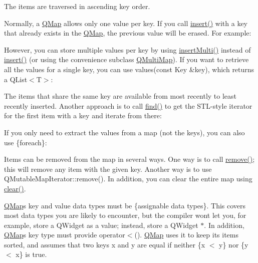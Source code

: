 \begin{DoxyCodeInclude}
\end{DoxyCodeInclude}
 The items are traversed in ascending key order.

Normally, a \hyperlink{class_q_map}{Q\+Map} allows only one value per key. If you call \hyperlink{class_q_map_a0cc56ab47ea14af1127ac7399814d289}{insert()} with a key that already exists in the \hyperlink{class_q_map}{Q\+Map}, the previous value will be erased. For example\+:


\begin{DoxyCodeInclude}
\end{DoxyCodeInclude}
 However, you can store multiple values per key by using \hyperlink{class_q_map_a075634da2cf912a20dd1c4a5835acfa3}{insert\+Multi()} instead of \hyperlink{class_q_map_a0cc56ab47ea14af1127ac7399814d289}{insert()} (or using the convenience subclass \hyperlink{class_q_multi_map}{Q\+Multi\+Map}). If you want to retrieve all the values for a single key, you can use values(const Key \&key), which returns a Q\+List$<$\+T$>$\+:


\begin{DoxyCodeInclude}
\end{DoxyCodeInclude}
 The items that share the same key are available from most recently to least recently inserted. Another approach is to call \hyperlink{class_q_map_a8cf44b635018eb178cc724ed20379d85}{find()} to get the S\+T\+L-\/style iterator for the first item with a key and iterate from there\+:


\begin{DoxyCodeInclude}
\end{DoxyCodeInclude}
 If you only need to extract the values from a map (not the keys), you can also use \{foreach\}\+:


\begin{DoxyCodeInclude}
\end{DoxyCodeInclude}
 Items can be removed from the map in several ways. One way is to call \hyperlink{class_q_map_af562610e90763fad449dfc130bd18fb8}{remove()}; this will remove any item with the given key. Another way is to use Q\+Mutable\+Map\+Iterator\+::remove(). In addition, you can clear the entire map using \hyperlink{class_q_map_acdbbd64e3cd0a6dae1ac57c1d41aacab}{clear()}.

\hyperlink{class_q_map}{Q\+Map}\textquotesingle{}s key and value data types must be \{assignable data types\}. This covers most data types you are likely to encounter, but the compiler won\textquotesingle{}t let you, for example, store a Q\+Widget as a value; instead, store a Q\+Widget $\ast$. In addition, \hyperlink{class_q_map}{Q\+Map}\textquotesingle{}s key type must provide operator$<$(). \hyperlink{class_q_map}{Q\+Map} uses it to keep its items sorted, and assumes that two keys {\ttfamily x} and {\ttfamily y} are equal if neither {\ttfamily }\{x $<$ y\} nor {\ttfamily }\{y $<$ x\} is true.

